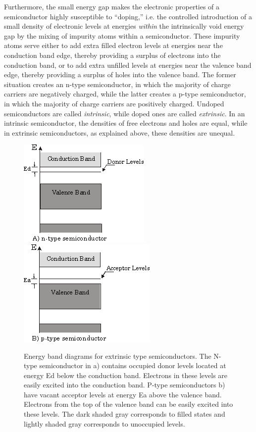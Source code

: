 \documentclass{../lab}
\begin{document}
Furthermore, the small energy gap makes the electronic properties of a semiconductor highly susceptible to ``doping,'' i.e. the controlled introduction of a small density of electronic levels at energies \emph{within} the intrinsically void energy gap by the mixing of impurity atoms within a semiconductor. These impurity atoms serve either to add extra filled electron levels at energies near the conduction band edge, thereby providing a surplus of electrons into the conduction band, or to add extra unfilled levels at energies near the valence band edge, thereby providing a surplus of holes into the valence band. The former situation creates an n-type semiconductor, in which the majority of charge carriers are negatively charged, while the latter creates a p-type semiconductor, in which the majority of charge carriers are positively charged. Undoped semiconductors are called \emph{intrinsic}, while doped ones are called \emph{extrinsic}. In an intrinsic semiconductor, the densities of free electrons and holes are equal, while in extrinsic semiconductors, as explained above, these densities are unequal.

\begin{figure}[h]
    \centering
    \href{http://experimentationlab.berkeley.edu/sites/default/files/images/SHEimage023.gif}{\includegraphics[width=0.33\linewidth,keepaspectratio]{images/SHEimage023.png}}
    \href{http://experimentationlab.berkeley.edu/sites/default/files/images/SHEimage024.gif}{\includegraphics[width=0.33\linewidth,keepaspectratio]{images/SHEimage024.png}}
    \caption{Energy band diagrams for extrinsic type semiconductors. The N-type semiconductor in a) contains occupied donor levels located at energy Ed below the conduction band. Electrons in these levels are easily excited into the conduction band. P-type semiconductors b) have vacant acceptor levels at energy Ea above the valence band. Electrons from the top of the valence band can be easily excited into these levels. The dark shaded gray corresponds to filled states and lightly shaded gray corresponds to unoccupied levels.}
\end{figure}
\end{document}
